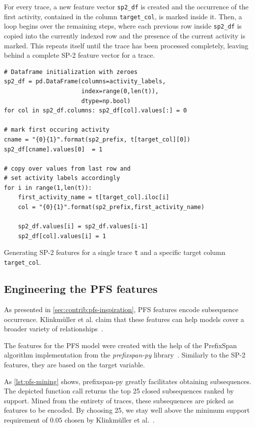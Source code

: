 For every trace, a new feature vector \texttt{sp2\_df} is created and the occurrence of the first activity, contained in the column \verb=target_col=, is marked inside it. Then, a loop begins over the remaining steps, where each previous row inside \texttt{sp2\_df} is copied into the currently indexed row and the presence of the current activity is marked. This repeats itself until the trace has been processed completely, leaving behind a complete SP-2 feature vector for a trace.

\begin{listing}[ht]
\begin{verbatim}
# Dataframe initialization with zeroes
sp2_df = pd.DataFrame(columns=activity_labels,
                      index=range(0,len(t)),
                      dtype=np.bool)
for col in sp2_df.columns: sp2_df[col].values[:] = 0

# mark first occuring activity
cname = "{0}{1}".format(sp2_prefix, t[target_col][0])
sp2_df[cname].values[0]  = 1

# copy over values from last row and
# set activity labels accordingly
for i in range(1,len(t)):
    first_activity_name = t[target_col].iloc[i]
    col = "{0}{1}".format(sp2_prefix,first_activity_name)

    sp2_df.values[i] = sp2_df.values[i-1]
    sp2_df[col].values[i] = 1
\end{verbatim}
\caption{Generating SP-2 features for a single trace \texttt{t} and a specific target column \texttt{target\_col}.}
\label{lst:sp2-generation}
\end{listing}

\FloatBarrier
\subsection*{Engineering the PFS features}
As presented in \autoref{sec:contrib:pfs-inspiration}, PFS features encode subsequence occurrence. Klinkmüller et al. claim that these features can help models cover a broader variety of relationships~\cite{klinkmuller2018reliablemonitoring}.

The features for the PFS model were created with the help of the PrefixSpan algorithm implementation from the \textit{prefixspan-py} library~\cite{web:prefixspan-py}. Similarly to the SP-2 features, they are based on the target variable.

As \autoref{lst:pfs-mining} shows, prefixspan-py greatly facilitates obtaining subsequences. The depicted function call returns the top 25 closed subsequences ranked by support. Mined from the entirety of traces, these subsequences are picked as features to be encoded. By choosing 25, we stay well above the minimum support requirement of $0.05$ chosen by Klinkmüller et al.~\cite{klinkmuller2018reliablemonitoring}.


